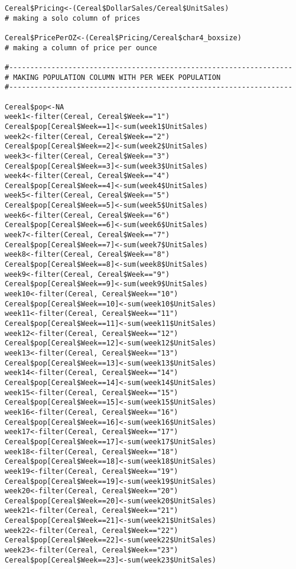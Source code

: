 \documentclass[12pt,english]{article}
\begin{document}
\begin{lstlisting}
Cereal$Pricing<-(Cereal$DollarSales/Cereal$UnitSales)
# making a solo column of prices

Cereal$PricePerOZ<-(Cereal$Pricing/Cereal$char4_boxsize)
# making a column of price per ounce

#-------------------------------------------------------------------
# MAKING POPULATION COLUMN WITH PER WEEK POPULATION
#-------------------------------------------------------------------

Cereal$pop<-NA
week1<-filter(Cereal, Cereal$Week=="1")
Cereal$pop[Cereal$Week==1]<-sum(week1$UnitSales)
week2<-filter(Cereal, Cereal$Week=="2")
Cereal$pop[Cereal$Week==2]<-sum(week2$UnitSales)
week3<-filter(Cereal, Cereal$Week=="3")
Cereal$pop[Cereal$Week==3]<-sum(week3$UnitSales)
week4<-filter(Cereal, Cereal$Week=="4")
Cereal$pop[Cereal$Week==4]<-sum(week4$UnitSales)
week5<-filter(Cereal, Cereal$Week=="5")
Cereal$pop[Cereal$Week==5]<-sum(week5$UnitSales)
week6<-filter(Cereal, Cereal$Week=="6")
Cereal$pop[Cereal$Week==6]<-sum(week6$UnitSales)
week7<-filter(Cereal, Cereal$Week=="7")
Cereal$pop[Cereal$Week==7]<-sum(week7$UnitSales)
week8<-filter(Cereal, Cereal$Week=="8")
Cereal$pop[Cereal$Week==8]<-sum(week8$UnitSales)
week9<-filter(Cereal, Cereal$Week=="9")
Cereal$pop[Cereal$Week==9]<-sum(week9$UnitSales)
week10<-filter(Cereal, Cereal$Week=="10")
Cereal$pop[Cereal$Week==10]<-sum(week10$UnitSales)
week11<-filter(Cereal, Cereal$Week=="11")
Cereal$pop[Cereal$Week==11]<-sum(week11$UnitSales)
week12<-filter(Cereal, Cereal$Week=="12")
Cereal$pop[Cereal$Week==12]<-sum(week12$UnitSales)
week13<-filter(Cereal, Cereal$Week=="13")
Cereal$pop[Cereal$Week==13]<-sum(week13$UnitSales)
week14<-filter(Cereal, Cereal$Week=="14")
Cereal$pop[Cereal$Week==14]<-sum(week14$UnitSales)
week15<-filter(Cereal, Cereal$Week=="15")
Cereal$pop[Cereal$Week==15]<-sum(week15$UnitSales)
week16<-filter(Cereal, Cereal$Week=="16")
Cereal$pop[Cereal$Week==16]<-sum(week16$UnitSales)
week17<-filter(Cereal, Cereal$Week=="17")
Cereal$pop[Cereal$Week==17]<-sum(week17$UnitSales)
week18<-filter(Cereal, Cereal$Week=="18")
Cereal$pop[Cereal$Week==18]<-sum(week18$UnitSales)
week19<-filter(Cereal, Cereal$Week=="19")
Cereal$pop[Cereal$Week==19]<-sum(week19$UnitSales)
week20<-filter(Cereal, Cereal$Week=="20")
Cereal$pop[Cereal$Week==20]<-sum(week20$UnitSales)
week21<-filter(Cereal, Cereal$Week=="21")
Cereal$pop[Cereal$Week==21]<-sum(week21$UnitSales)
week22<-filter(Cereal, Cereal$Week=="22")
Cereal$pop[Cereal$Week==22]<-sum(week22$UnitSales)
week23<-filter(Cereal, Cereal$Week=="23")
Cereal$pop[Cereal$Week==23]<-sum(week23$UnitSales)

\end{lstlisting}
\end{document}
